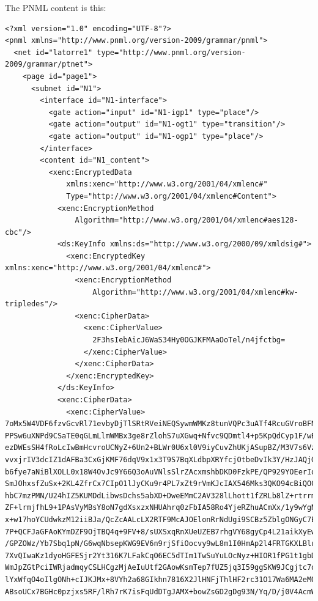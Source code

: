 The PNML content is this:
\begin{lstlisting}
<?xml version="1.0" encoding="UTF-8"?>
<pnml xmlns="http://www.pnml.org/version-2009/grammar/pnml">
  <net id="latorre1" type="http://www.pnml.org/version-2009/grammar/ptnet">
    <page id="page1">
      <subnet id="N1">
        <interface id="N1-interface">
          <gate action="input" id="N1-igp1" type="place"/>
          <gate action="output" id="N1-ogt1" type="transition"/>
          <gate action="output" id="N1-ogp1" type="place"/>
        </interface>
        <content id="N1_content">
          <xenc:EncryptedData
              xmlns:xenc="http://www.w3.org/2001/04/xmlenc#" 
              Type="http://www.w3.org/2001/04/xmlenc#Content">
            <xenc:EncryptionMethod 
                Algorithm="http://www.w3.org/2001/04/xmlenc#aes128-cbc"/>
            <ds:KeyInfo xmlns:ds="http://www.w3.org/2000/09/xmldsig#">
              <xenc:EncryptedKey xmlns:xenc="http://www.w3.org/2001/04/xmlenc#">
                <xenc:EncryptionMethod 
                    Algorithm="http://www.w3.org/2001/04/xmlenc#kw-tripledes"/>
                <xenc:CipherData>
                  <xenc:CipherValue>
                    2F3hsIebAicJ6WaS34Hy0OGJKFMAaOoTel/n4jfctbg=
                  </xenc:CipherValue>
                </xenc:CipherData>
              </xenc:EncryptedKey>
            </ds:KeyInfo>
            <xenc:CipherData>
              <xenc:CipherValue>
7oMx5W4VDF6fzvGcvRl71evbyDjTlSRtRVeiNEQSywmWMKz8tunVQPc3uATf4RcuGVroBFNt/3wn
PPSw6uXNPd9CSaTE0qGLmLlmWMBx3ge8rZlohS7uXGwq+Nfvc9QDmtl4+p5KpQdCyp1F/wBhVkGH
ezDWEsSH4fRoLcIwBmHcvroUCNyZ+6Un2+BLWr0U6xl0V9iyCuvZhUKjASupBZ/M3V7s6VzrzPtr
vvxjrIV3dcIZ1dAFBa3CxGjKMF76dqV9x1x3T9S7BqXLdbpXRYfcjOtbeDvIk3Y/HzJAQjGZaVfB
b6fye7aNiBlXOLL0x18W4OvJc9Y66Q3oAuVNlsSlrZAcxmshbDKD0FzkPE/QP929YOEerIq11KGw
SmJOhxsfZuSx+2KL4ZfrCx7CIpO1lJyCKu9r4PL7xZt9rVmKJcIAX546Mks3QKO94cBiQOCh8GbE
hbC7mzPMN/U24hIZ5KUMDdLibwsDchs5abXD+DweEMmC2AV328lLhott1fZRLb8lZ+rtrrmvnHIM
ZF+lrmjfhL9+1PAsVyMBsY8oN7gdXsxzxNHUAhrq0zFbIA58Ro4YjeRZhuACmXx/1y9wYgNjKSwo
x+w17hoYCUdwkzM12iiBJa/QcZcAALcLX2RTF9McAJOElonRrNdUgi9SCBz5ZblgONGyC7Edla7f
7P+QCFJaGFAoKYmDZF9OjTBQ4q+9FV+8/sUXSxqRnXUeUZEB7rhgVY68gyCp4L21aikXyEwQ2PkR
/GPZOWz/Yb7Sbq1pN/G6wqNbsepKWG9EV6n9rjSfiOocvy9wL8m1I0HmAp2l4FRTGKXLBluf0in+
7XvQIwaKz1dyoHGFESjr2Yt316K7LFakCqO6EC5dTIm1TwSuYuLOcNyz+HIOR1fPG1t1gbDok55R
WmJpZGtPciIWRjadmqyCSLHCgzMjAeIuUtf2GAowKsmTep7fUZ5jq3I59ggSKW9JCgjtc7oePQpG
lYxWfqO4oIlgONh+cIJKJMx+8VYh2a68GIkhn7816X2JlHNFjThlHF2rc31O17Wa6MA2eMO8zeyQ
ABsoUCx7BGHc0pzjxs5RF/lRh7rK7isFqUdDTgJAMX+bowZsGD2gDg93N/Yq/D/j0V4AcmWy5dAi

\end{lstlisting}
